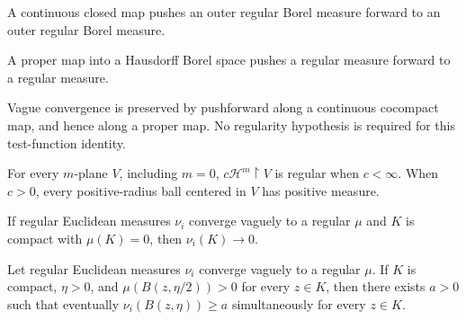 \begin{lemma}
\label{lem:closed-map-outer-regularity}

A continuous closed map pushes an outer regular Borel measure forward to an outer regular Borel measure.
\end{lemma}

\begin{lemma}
\label{lem:proper-map-regularity}

A proper map into a Hausdorff Borel space pushes a regular measure forward to a regular measure.
\end{lemma}

\begin{lemma}
\label{lem:vague-cocompact-pushforward}

Vague convergence is preserved by pushforward along a continuous cocompact map, and hence along a proper map. No regularity hypothesis is required for this test-function identity.
\end{lemma}

\begin{lemma}
\label{lem:flat-measure-regularity}

For every $m$-plane $V$, including $m=0$, $c\mathcal H^m\!\restriction V$ is regular when $c<\infty$. When $c>0$, every positive-radius ball centered in $V$ has positive measure.
\end{lemma}

\begin{lemma}
\label{lem:vague-compact-null-mass}

If regular Euclidean measures $\nu_i$ converge vaguely to a regular $\mu$ and $K$ is compact with $\mu(K)=0$, then $\nu_i(K)\to0$.
\end{lemma}

\begin{lemma}
\label{lem:vague-uniform-ball-lower}

Let regular Euclidean measures $\nu_i$ converge vaguely to a regular $\mu$. If $K$ is compact, $\eta>0$, and $\mu(B(z,\eta/2))>0$ for every $z\in K$, then there exists $a>0$ such that eventually $\nu_i(B(z,\eta))\ge a$ simultaneously for every $z\in K$.
\end{lemma}

